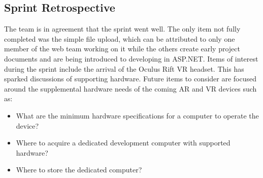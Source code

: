     \subsection{Sprint Retrospective}
    \label{sec:Sprint1_retrospective}
        \hspace{7mm}
        The team is in agreement that the sprint went well. The only item not fully completed was the simple
        file upload, which can be attributed to only one member of the web team working on it while the others
        create early project documents and are being introduced to developing in ASP.NET. Items of interest 
        during the sprint include the arrival of the Oculus Rift VR headset. This has sparked discussions of
        supporting hardware. Future items to consider are focused around the supplemental hardware needs of the coming AR and VR devices such as:
        \begin{itemize}
            \item What are the minimum hardware specifications for a computer to operate the device?
            \item Where to acquire a dedicated development computer with supported hardware?
            \item Where to store the dedicated computer? 
        \end{itemize}
